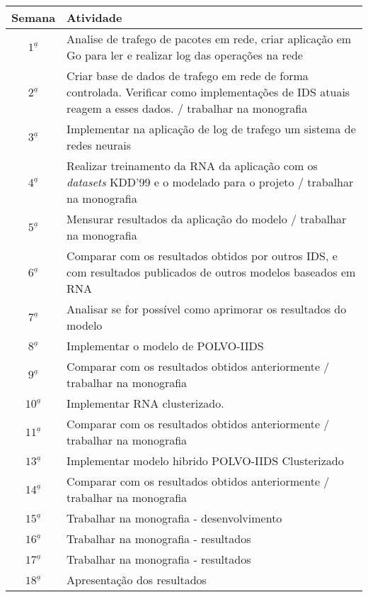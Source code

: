 \documentclass[
	12pt,				%
	openright,			%
	oneside,
	a4paper,			%
	english,			%
	french,				%
	spanish,			%
	brazil				%
	]{abntex2}
\begin{document}
\vspace{.25cm}
\begin{center}
	\begin{tabular}{ |c| p{13.5cm} | }
		\hline
		\textbf{Semana} & \textbf{Atividade} \\ \hline \hline
		$1^{\underline a}$ & Analise de trafego de pacotes em rede, criar aplicação em Go para ler e realizar log das operações na rede \\ \hline
		$2^{\underline a}$ & Criar base de dados de trafego em rede de forma controlada. Verificar como implementações de IDS atuais reagem a esses dados. / trabalhar na monografia \\ \hline
		$3^{\underline a}$ & Implementar na aplicação de log de trafego um sistema de redes neurais \\ \hline		
		$4^{\underline a}$ & Realizar treinamento da RNA da aplicação com os \textit{datasets} KDD'99 e o modelado para o projeto / trabalhar na monografia \\ \hline		
		$5^{\underline a}$ & Mensurar resultados da aplicação do modelo / trabalhar na monografia \\ \hline		
		$6^{\underline a}$ & Comparar com os resultados obtidos por outros IDS, e com resultados publicados de outros modelos baseados em RNA  \\ \hline		
		$7^{\underline a}$ & Analisar se for possível como aprimorar os resultados do modelo \\ \hline		
		$8^{\underline a}$ & Implementar o modelo de POLVO-IIDS \\ \hline		
		$9^{\underline a}$ & Comparar com os resultados obtidos anteriormente / trabalhar na monografia \\ \hline		
		$10^{\underline a}$ & Implementar RNA clusterizado. \\ \hline		
		$11^{\underline a}$ & Comparar com os resultados obtidos anteriormente / trabalhar na monografia \\ \hline		
		$13^{\underline a}$ & Implementar modelo hibrido POLVO-IIDS Clusterizado \\ \hline		
		$14^{\underline a}$ & Comparar com os resultados obtidos anteriormente / trabalhar na monografia \\ \hline		
		$15^{\underline a}$ & Trabalhar na monografia - desenvolvimento \\ \hline		
		$16^{\underline a}$ & Trabalhar na monografia - resultados \\ \hline		
		$17^{\underline a}$ & Trabalhar na monografia - resultados \\ \hline		
		$18^{\underline a}$ & Apresentação dos resultados \\ \hline
	\end{tabular}
\end{center}
\end{document}
